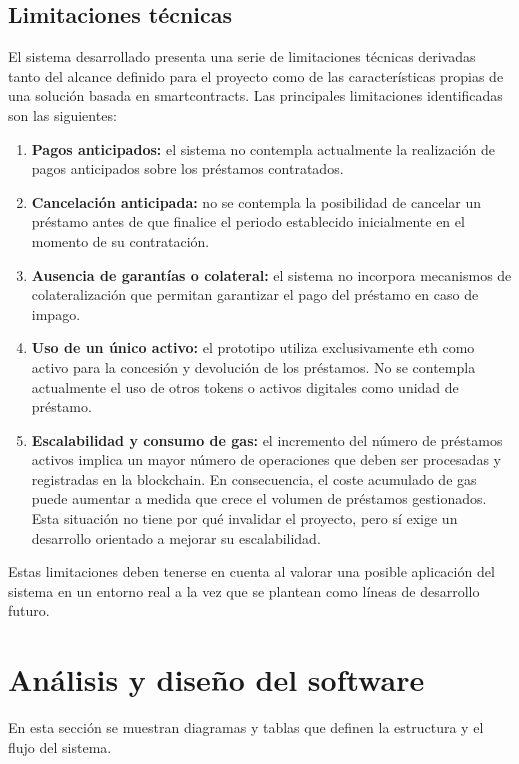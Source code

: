 \subsection{Limitaciones técnicas}

El sistema desarrollado presenta una serie de limitaciones técnicas derivadas 
tanto del alcance definido para el proyecto como de las características propias de 
una solución basada en \glspl{smartcontract}. Las principales
limitaciones identificadas son las siguientes:

\begin{enumerate}
    \item \textbf{Pagos anticipados:} el sistema no contempla actualmente la
    realización de pagos anticipados sobre los préstamos contratados.

    \item \textbf{Cancelación anticipada:} no se contempla la posibilidad de
    cancelar un préstamo antes de que finalice el periodo establecido inicialmente
    en el momento de su contratación.

    \item \textbf{Ausencia de garantías o colateral:} el sistema no incorpora
    mecanismos de colateralización que permitan garantizar el pago del préstamo
    en caso de impago.

    \item \textbf{Uso de un único activo:} el prototipo utiliza exclusivamente
    \gls{eth} como activo para la concesión y devolución de los préstamos.
    No se contempla actualmente el uso de otros tokens o activos digitales como
    unidad de préstamo.

    \item \textbf{Escalabilidad y consumo de \gls{gas}:} el incremento del
    número de préstamos activos implica un mayor número de operaciones que deben
    ser procesadas y registradas en la \gls{blockchain}. En consecuencia, el coste
    acumulado de \gls{gas} puede aumentar a medida que crece el volumen de
    préstamos gestionados. Esta situación no tiene por qué invalidar el proyecto, pero sí exige un desarrollo orientado a mejorar su escalabilidad.
    \end{enumerate}

Estas limitaciones deben tenerse en cuenta al valorar una posible aplicación del
sistema en un entorno real a la vez que se plantean como líneas de desarrollo 
futuro.

\section{Análisis y diseño del software}
En esta sección se muestran diagramas y tablas que definen la estructura y 
el flujo del sistema.

